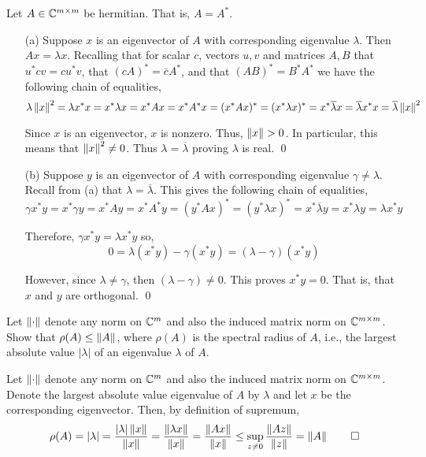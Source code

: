 \documentclass[10pt]{article}
\begin{document}
\begin{solution}[Solution]
Let \( A\in\mathbb{C}^{m\times m} \) be hermitian. That is, \( A=A^* \).
\begin{enumerate}
\item[(a)] Suppose \( x \) is an eigenvector of \( A \) with corresponding eigenvalue \( \lambda \). Then \( Ax=\lambda x \). Recalling that for scalar \( c \), vectors \( u,v \) and matrices \( A,B \) that \( u^*cv = cu^*v \), that \( (cA)^* = \overline{c}A^* \), and that \( (AB)^* = B^*A^* \) we have the following chain of equalities,
\[ \lambda\left\lVert x\right\rVert^2 = \lambda x^*x = x^*\lambda x = x^*Ax = x^*A^*x = (x^*Ax)^* = (x^*\lambda x)^* = x^*\overline{\lambda}x = \overline{\lambda}x^*x= \overline{\lambda}\left\lVert x\right\rVert^2 \]

Since \( x \) is an eigenvector, \( x \) is nonzero. Thus, \( \left\lVert x\right\rVert> 0 \). In particular, this means that \( \left\lVert x\right\rVert^2\neq0 \). Thus \( \lambda = \overline{\lambda} \) proving \( \lambda \) is real. \qed


\item[(b)] Suppose  \( y \) is an eigenvector of \( A \) with corresponding eigenvalue \( \gamma \neq \lambda \). Recall from (a) that \( \lambda = \overline{\lambda} \). This gives the following chain of equalities,
\[ \gamma x^*y = x^*\gamma y = x^*Ay = x^*A^*y = (y^*Ax)^* = (y^*\lambda x)^* = x^*\overline{\lambda}y = x^*\lambda y = \lambda x^*y \]

Therefore, \( \gamma x^*y = \lambda x^*y \) so, \[ 0 = \lambda (x^*y) - \gamma (x^*y)  = (\lambda-\gamma)(x^*y) \]

However, since \( \lambda\neq \gamma \), then \( (\lambda-\gamma)\neq 0  \). This proves \( x^*y = 0 \). That is, that \( x \) and \( y \) are orthogonal. \qed
\end{enumerate}
\end{solution}
	
\begin{problem}[Exercise 3.2]
Let \( \left\lVert\cdot\right\rVert \) denote any norm on \( \mathbb{C}^m \) and also the induced matrix norm on \( \mathbb{C}^{m\times m} \). Show that \( \rho(A)\leq\left\lVert A\right\rVert \), where \( \rho(A) \) is the spectral radius of \( A \), i.e., the largest absolute value \( |\lambda| \) of an eigenvalue \( \lambda \) of \( A \).
\end{problem}

\begin{solution}[Solution]
Let \( \left\lVert\cdot\right\rVert \) denote any norm on \( \mathbb{C}^m \) and also the induced matrix norm on \( \mathbb{C}^{m\times m} \). Denote the largest absolute value eigenvalue of \( A \) by \( \lambda \) and let \( x \) be the corresponding eigenvector. Then, by definition of supremum,
\[ \rho(A) = |\lambda| = \dfrac{|\lambda|\norm{x}}{\norm{x}} = \dfrac{\norm{\lambda x}}{\norm{x}} = \dfrac{\norm{Ax}}{\norm{x}} \leq \sup_{z\neq0}\dfrac{\norm{Az}}{\norm{z}} = \norm{A} \tag*{\qed} \]
\end{solution}
	
\end{document}
